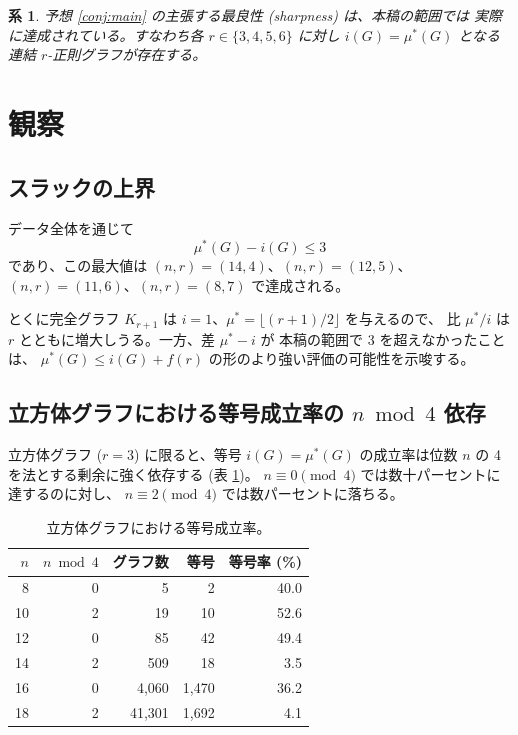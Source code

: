 \documentclass[paper=a4,fontsize=10.5pt,jafontsize=10.5pt]{jlreq}
\theoremstyle{plain}
\newtheorem{corollary}[theorem]{系}
\theoremstyle{definition}
\begin{document}
\begin{corollary}
予想 \ref{conj:main} の主張する最良性 (sharpness) は、本稿の範囲では
実際に達成されている。すなわち各 $r \in \{3, 4, 5, 6\}$ に対し
$i(G) = \mu^*(G)$ となる連結 $r$-正則グラフが存在する。
\end{corollary}

\section{観察}\label{sec:obs}

\subsection{スラックの上界}

データ全体を通じて
\[ \mu^*(G) - i(G) \le 3 \]
であり、この最大値は $(n,r)=(14,4)$、$(n,r)=(12,5)$、$(n,r)=(11,6)$、$(n,r)=(8,7)$ で達成される。

とくに完全グラフ $K_{r+1}$ は $i = 1$、$\mu^* = \lfloor (r+1)/2 \rfloor$ を与えるので、
比 $\mu^*/i$ は $r$ とともに増大しうる。一方、差 $\mu^* - i$ が
本稿の範囲で 3 を超えなかったことは、
$\mu^*(G) \le i(G) + f(r)$ の形のより強い評価の可能性を示唆する。

\subsection{立方体グラフにおける等号成立率の $n \bmod 4$ 依存}

立方体グラフ ($r=3$) に限ると、等号 $i(G)=\mu^*(G)$ の成立率は位数 $n$ の
4 を法とする剰余に強く依存する (表 \ref{tab:cubic})。
$n \equiv 0 \pmod 4$ では数十パーセントに達するのに対し、
$n \equiv 2 \pmod 4$ では数パーセントに落ちる。

\begin{table}[htbp]
\centering
\caption{立方体グラフにおける等号成立率。}
\label{tab:cubic}
\begin{tabular}{rrrrr}
\toprule
$n$ & $n \bmod 4$ & グラフ数 & 等号 & 等号率 (\%) \\
\midrule
8 & 0 & 5 & 2 & 40.0 \\
10 & 2 & 19 & 10 & 52.6 \\
12 & 0 & 85 & 42 & 49.4 \\
14 & 2 & 509 & 18 & 3.5 \\
16 & 0 & 4,060 & 1,470 & 36.2 \\
18 & 2 & 41,301 & 1,692 & 4.1 \\
\bottomrule
\end{tabular}
\end{table}
\end{document}

